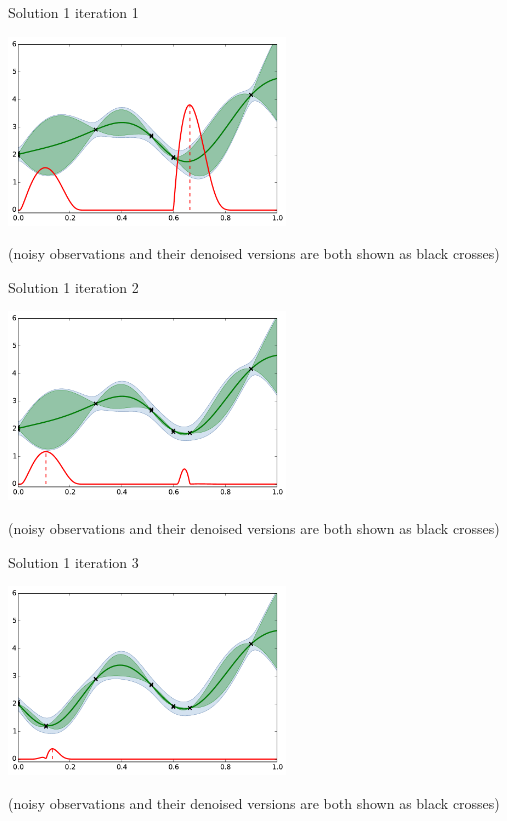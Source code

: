 \begin{frame}[noframenumbering]{Solution 1}
iteration 1
\begin{center}
\includegraphics[height=5cm]{4_optimization/figures/python/ego_EI1n1}
\end{center}
\tiny (noisy observations and their denoised versions are both shown as black crosses)\\
\end{frame}

\begin{frame}[noframenumbering]{Solution 1}
iteration 2
\begin{center}
\includegraphics[height=5cm]{4_optimization/figures/python/ego_EI1n2}
\end{center}
\tiny (noisy observations and their denoised versions are both shown as black crosses)\\
\end{frame}

\begin{frame}[noframenumbering]{Solution 1}
iteration 3
\begin{center}
\includegraphics[height=5cm]{4_optimization/figures/python/ego_EI1n3}
\end{center}
\tiny (noisy observations and their denoised versions are both shown as black crosses)\\
\end{frame}

